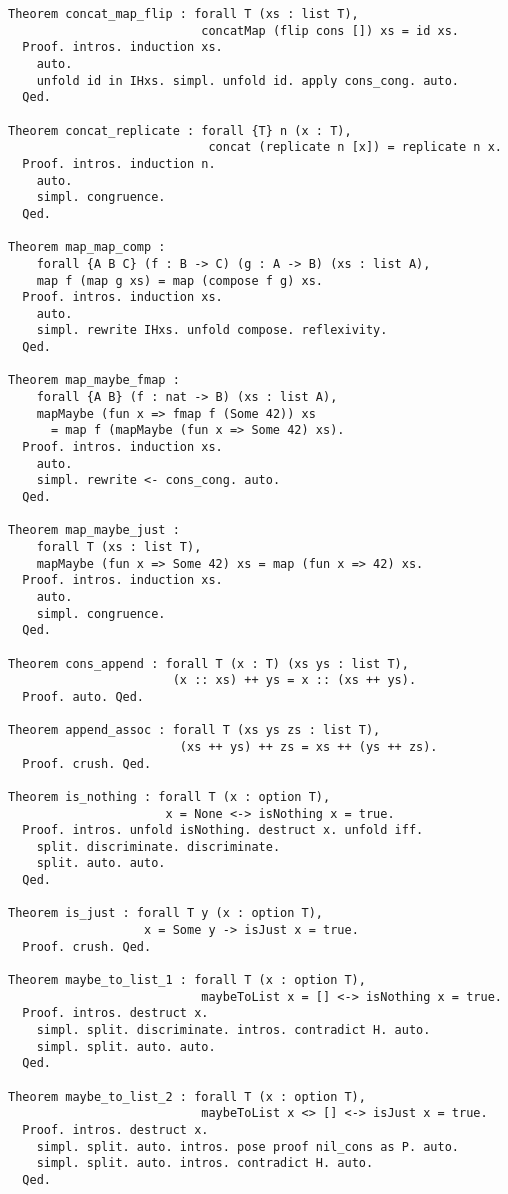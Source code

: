 \begin{verbatim}
Theorem concat_map_flip : forall T (xs : list T),
                           concatMap (flip cons []) xs = id xs.
  Proof. intros. induction xs.
    auto.
    unfold id in IHxs. simpl. unfold id. apply cons_cong. auto.
  Qed.

Theorem concat_replicate : forall {T} n (x : T),
                            concat (replicate n [x]) = replicate n x.
  Proof. intros. induction n.
    auto.
    simpl. congruence.
  Qed.

Theorem map_map_comp :
    forall {A B C} (f : B -> C) (g : A -> B) (xs : list A),
    map f (map g xs) = map (compose f g) xs.
  Proof. intros. induction xs.
    auto.
    simpl. rewrite IHxs. unfold compose. reflexivity.
  Qed.

Theorem map_maybe_fmap :
    forall {A B} (f : nat -> B) (xs : list A),
    mapMaybe (fun x => fmap f (Some 42)) xs
      = map f (mapMaybe (fun x => Some 42) xs).
  Proof. intros. induction xs.
    auto.
    simpl. rewrite <- cons_cong. auto.
  Qed.

Theorem map_maybe_just :
    forall T (xs : list T),
    mapMaybe (fun x => Some 42) xs = map (fun x => 42) xs.
  Proof. intros. induction xs.
    auto.
    simpl. congruence.
  Qed.

Theorem cons_append : forall T (x : T) (xs ys : list T),
                       (x :: xs) ++ ys = x :: (xs ++ ys).
  Proof. auto. Qed.

Theorem append_assoc : forall T (xs ys zs : list T),
                        (xs ++ ys) ++ zs = xs ++ (ys ++ zs).
  Proof. crush. Qed.

Theorem is_nothing : forall T (x : option T),
                      x = None <-> isNothing x = true.
  Proof. intros. unfold isNothing. destruct x. unfold iff.
    split. discriminate. discriminate.
    split. auto. auto.
  Qed.

Theorem is_just : forall T y (x : option T),
                   x = Some y -> isJust x = true.
  Proof. crush. Qed.

Theorem maybe_to_list_1 : forall T (x : option T),
                           maybeToList x = [] <-> isNothing x = true.
  Proof. intros. destruct x.
    simpl. split. discriminate. intros. contradict H. auto.
    simpl. split. auto. auto.
  Qed.

Theorem maybe_to_list_2 : forall T (x : option T),
                           maybeToList x <> [] <-> isJust x = true.
  Proof. intros. destruct x.
    simpl. split. auto. intros. pose proof nil_cons as P. auto.
    simpl. split. auto. intros. contradict H. auto.
  Qed.


\end{verbatim}
